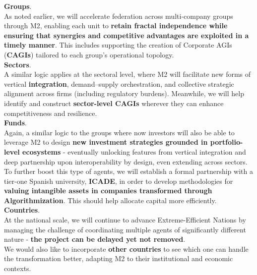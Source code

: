 \documentclass{article}
\begin{document}
\textbf{Groups}.\\

As noted earlier, we will accelerate federation across multi-company groups through M2, enabling each unit to \textbf{retain fractal independence while ensuring that synergies and competitive advantages are exploited in a timely manner}. This includes supporting the creation of Corporate AGIs (\textbf{CAGIs}) tailored to each group’s operational topology.\\

\textbf{Sectors}.\\

A similar logic applies at the sectoral level, where M2 will facilitate new forms of vertical \textbf{integration}, demand–supply orchestration, and collective strategic alignment across firms (including regulatory burdens). Meanwhile, we will help identify and construct \textbf{sector-level CAGIs} wherever they can enhance competitiveness and resilience.\\

\textbf{Funds}.\\

Again, a similar logic to the groups where now investors will also be able to leverage M2 to design \textbf{new investment strategies grounded in portfolio-level ecosystems} - eventually unlocking features from vertical integration and deep partnership upon interoperability by design, even extending across sectors.\\

To further boost this type of agents, we will establish a formal partnership with a tier-one Spanish university, \textbf{ICADE}, in order to develop methodologies for \textbf{valuing intangible assets in companies transformed through Algorithmization}. This should help allocate capital more efficiently.\\

\textbf{Countries}.\\

At the national scale, we will continue to advance Extreme-Efficient Nations by managing the challenge of coordinating multiple agents of significantly different nature - \textbf{the project can be delayed yet not removed}.\\

We would also like to incorporate \textbf{other countries} to see which one can handle the transformation better, adapting M2 to their institutional and economic contexts.\\
\end{document}
